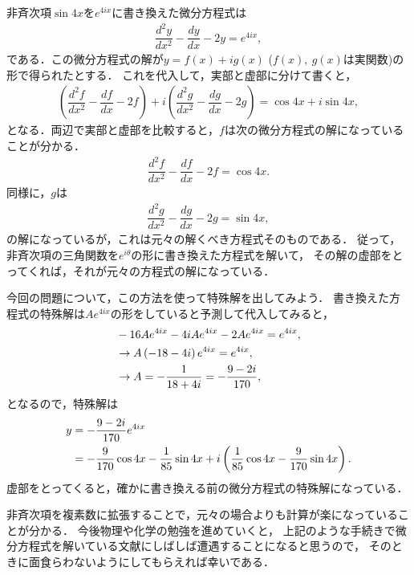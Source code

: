 非斉次項$\sin 4x$を$e^{4ix}$に書き換えた微分方程式は
\begin{align}
 \dfrac{d^2y}{dx^2} - \dfrac{dy}{dx} - 2y = e^{4ix}, 
\end{align}
である．この微分方程式の解が$y = f(x) + i g(x)$ ($f(x),~g(x)$は実関数)の形で得られたとする．
これを代入して，実部と虚部に分けて書くと，
\begin{align}
  \left(\dfrac{d^2f}{dx^2} - \dfrac{df}{dx} - 2f \right) 
  + i \left(\dfrac{d^2 g}{dx^2} - \dfrac{dg}{dx} - 2g\right) = \cos 4x + i\sin 4x, 
\end{align}
となる．両辺で実部と虚部を比較すると，$f$は次の微分方程式の解になっていることが分かる．
\begin{align}
 \dfrac{d^2f}{dx^2} - \dfrac{df}{dx} - 2f = \cos 4x.
\end{align}
同様に，$g$は
\begin{align}
 \dfrac{d^2g}{dx^2} - \dfrac{dg}{dx} - 2g = \sin 4x,
\end{align}
の解になっているが，これは元々の解くべき方程式そのものである．
従って，非斉次項の三角関数を$e^{i\theta}$の形に書き換えた方程式を解いて，
その解の虚部をとってくれば，それが元々の方程式の解になっている．

今回の問題について，この方法を使って特殊解を出してみよう．
書き換えた方程式の特殊解は$Ae^{4ix}$の形をしていると予測して代入してみると，
\begin{align}
  &  -16Ae^{4ix} - 4iAe^{4ix} -2Ae^{4ix} = e^{4ix}, \notag \\
  &\rightarrow A \left(-18 - 4i\right) e^{4ix} = e^{4ix}, \notag \\
  &\rightarrow A = -\dfrac{1}{18 + 4i} = -\dfrac{9 - 2 i}{170},
\end{align}
となるので，特殊解は
\begin{align}
  y &= -\dfrac{9-2i}{170}e^{4ix} \notag \\
    &= -\dfrac{9}{170}\cos 4x - \dfrac{1}{85}\sin 4x 
      + i\left(\dfrac{1}{85}\cos 4x - \dfrac{9}{170}\sin 4x\right).
\end{align}
虚部をとってくると，確かに書き換える前の微分方程式の特殊解になっている．

非斉次項を複素数に拡張することで，元々の場合よりも計算が楽になっていることが分かる．
今後物理や化学の勉強を進めていくと，
上記のような手続きで微分方程式を解いている文献にしばしば遭遇することになると思うので，
そのときに面食らわないようにしてもらえれば幸いである．

